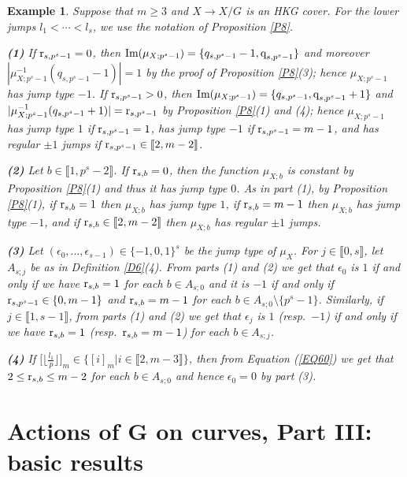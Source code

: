 \documentclass[11pt]{amsart}
\newtheorem{ex}[theorem]{Example}
\def\Im{\textup{Im}}
\def\r{\textup{r}}
\def\q{\textup{q}}
\begin{document}
\begin{ex}\normalfont\label{EX9.5}
Suppose that $m\ge 3$ and $X\rightarrow X/G$ is an HKG cover. For the lower jumps $l_1<\cdots<l_s$, we use the notation of Proposition \ref{P8}.

\medskip
{\bf (1)} If $\r_{s,p^s-1}=0$, then $\Im(\mu_{X;p^s-1})=\{q_{s,p^s-1}-1,\q_{s,p^s-1}\}$ and moreover $|\mu^{-1}_{X;p^s-1}(q_{s,p^s-1}-1)|=1$ by the proof of Proposition \ref{P8}(3); hence $\mu_{X;p^s-1}$ has jump type $-1$. If  $\r_{s,p^s-1}>0$, then $\Im(\mu_{X;p^s-1})=\{q_{s,p^s-1},\q_{s,p^s-1}+1\}$ and $|\mu^{-1}_{X;p^s-1}(q_{s,p^s-1}+1)|=\r_{s,p^s-1}$ by Proposition \ref{P8}(1) and (4); hence $\mu_{X;p^s-1}$ has jump type $1$ if $\r_{s,p^s-1}=1$, has jump type $-1$ if $\r_{s,p^s-1}=m-1$, and has regular $\pm 1$ jumps if $\r_{s,p^s-1}\in\llbracket2,m-2\rrbracket$. 

\smallskip
{\bf (2)} Let $b\in\llbracket1,p^s-2\rrbracket$. If $\r_{s,b}=0$, then the function $\mu_{X;b}$ is constant by Proposition \ref{P8}(1) and thus it has jump type $0$. As in part (1), by Proposition \ref{P8}(1), if $\r_{s,b}=1$ then $\mu_{X;b}$ has jump type $1$, if $\r_{s,b}=m-1$ then $\mu_{X;b}$ has jump type $-1$, and if $\r_{s,b}\in\llbracket2,m-2\rrbracket$ then $\mu_{X;b}$ has regular $\pm 1$ jumps.

\smallskip
{\bf (3)} Let $(\epsilon_0,\ldots,\epsilon_{s-1})\in\{-1,0,1\}^s$ be the jump type of $\mu_X$. For $j\in\llbracket0,s\rrbracket$, let $A_{s;j}$ be as in Definition \ref{D6}(4). From parts (1) and (2) we get that $\epsilon_0$ is $1$ if and only if we have $\r_{s,b}=1$ for each $b\in A_{s;0}$ and it is $-1$ if and only if $\r_{s,p^s-1}\in\{0,m-1\}$ and $\r_{s,b}=m-1$ for each $b\in A_{s;0}\setminus\{p^s-1\}$. Similarly, if $j\in\llbracket1,s-1\rrbracket$, from parts (1) and (2) we get that $\epsilon_j$ is $1$ (resp.\ $-1$) if and only if we have $\r_{s,b}=1$ (resp.\ $\r_{s,b}=m-1$) for each $b\in A_{s;j}$.

\smallskip
{\bf (4)} If $\bigl[\big\lfloor\frac{l_1}{p}\big\rfloor\bigr]_m\in\{[i]_m|i\in\llbracket2,m-3\rrbracket\}$, then from Equation (\ref{EQ60}) we get that $2\le \r_{s,b}\le m-2$ for each $b\in A_{s;0}$ and hence $\epsilon_0=0$ by part (3). 
\end{ex}

\section{Actions of G on curves, Part III: basic results}\label{S12}
\end{document}
